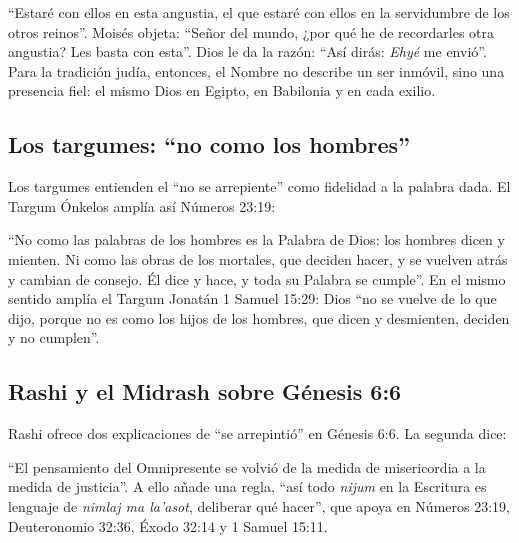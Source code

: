 
``Estaré con ellos en esta angustia, el que estaré con ellos en la servidumbre de los otros reinos''. Moisés objeta: ``Señor del mundo, ¿por qué he de recordarles otra angustia? Les basta con esta''. Dios le da la razón: ``Así dirás: \emph{Ehyé} me envió''. Para la tradición judía, entonces, el Nombre no describe un ser inmóvil, sino una presencia fiel: el mismo Dios en Egipto, en Babilonia y en cada exilio.

\subsection{Los targumes: “no como los hombres”}
Los targumes entienden el ``no se arrepiente'' como fidelidad a la palabra dada. El Targum Ónkelos amplía así Números 23:19:


``No como las palabras de los hombres es la Palabra de Dios: los hombres dicen y mienten. Ni como las obras de los mortales, que deciden hacer, y se vuelven atrás y cambian de consejo. Él dice y hace, y toda su Palabra se cumple''. En el mismo sentido amplía el Targum Jonatán 1 Samuel 15:29: Dios ``no se vuelve de lo que dijo, porque no es como los hijos de los hombres, que dicen y desmienten, deciden y no cumplen''.

\subsection{Rashi y el Midrash sobre Génesis 6:6}
Rashi ofrece dos explicaciones de ``se arrepintió'' en Génesis 6:6. La segunda dice:


\noindent``El pensamiento del Omnipresente se volvió de la medida de misericordia a la medida de justicia''. A ello añade una regla, ``así todo \emph{nijum} en la Escritura es lenguaje de \emph{nimlaj ma la'asot}, deliberar qué hacer'', que apoya en Números 23:19, Deuteronomio 32:36, Éxodo 32:14 y 1 Samuel 15:11.

